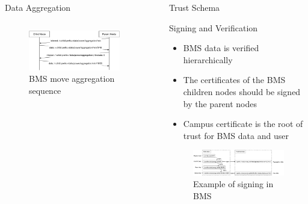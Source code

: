 \documentclass[final,hyperref={pdfpagelabels=false},20pt]{beamer}
\begin{document}
\begin{frame}[t]
\begin{columns}[t]
\begin{column}{.465\textwidth}
\begin{block}{Data Aggregation}
\begin{columns}[T]
\begin{column}{.56\textwidth}
\begin{figure}
\includegraphics[width=\linewidth]{bms-move-aggregate-sequence}
\caption{BMS move aggregation sequence}
\label{fig:move-aggregation}
\end{figure}
\end{column}

\end{columns}

\end{block}

\end{column} %

\begin{column}{.02\textwidth}\end{column} %
 
\begin{column}{.465\textwidth} %


\begin{block}{Trust Schema}

Signing and Verification

\begin{itemize}
\item{BMS data is verified hierarchically}
\item{The certificates of the BMS children nodes should be signed by the parent nodes}
\item{Campus certificate is the root of trust for BMS data and user}
\end{itemize}

\begin{figure}
\includegraphics[width=0.95\linewidth]{bms-signing-verification}
\caption{Example of signing in BMS}
\label{fig:bms-signing-example}
\end{figure}


\end{block}
\end{column}
\end{columns}
\end{frame}
\end{document}
